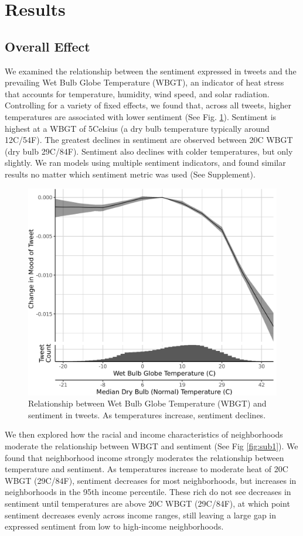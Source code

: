 \documentclass{article}
\begin{document}
\section{Results}

\subsection{Overall Effect}
We examined the relationship between the sentiment expressed in tweets and the prevailing Wet Bulb Globe Temperature (WBGT), an indicator of heat stress that accounts for temperature, humidity, wind speed, and solar radiation.  Controlling for a variety of fixed effects, we found that, across all tweets, higher temperatures are associated with lower sentiment (See Fig. \ref{fig:wbgt}).  Sentiment is highest at a WBGT of 5\textdegree Celsius (a dry bulb temperature typically around 12\textdegree C/54\textdegree F).  The greatest declines in sentiment are observed between 20\textdegree C WBGT (dry bulb 29\textdegree C/84\textdegree F).  Sentiment also declines with colder temperatures, but only slightly.  We ran models using multiple sentiment indicators, and found similar results no matter which sentiment metric was used (See Supplement).

\begin{figure}[H]
  \centering
  \includegraphics[width=0.5\linewidth]{../res/wbgt.png}
  \caption{Relationship between Wet Bulb Globe Temperature (WBGT) and sentiment in tweets.  As temperatures increase, sentiment declines.}
  \label{fig:wbgt}
\end{figure}

We then explored how the racial and income characteristics of neighborhoods moderate the relationship between WBGT and sentiment (See Fig \ref{fig:sub1}).  We found that neighborhood income strongly moderates the relationship between temperature and sentiment.  As temperatures increase to moderate heat of 20\textdegree C WBGT (29\textdegree C/84\textdegree F), sentiment decreases for most neighborhoods, but increases in neighborhoods in the 95th income percentile.  These rich do not see decreases in sentiment until temperatures are above 20\textdegree C WBGT (29\textdegree C/84\textdegree F), at which point sentiment decreases evenly across income ranges, still leaving a large gap in expressed sentiment from low to high-income neighborhoods.
\end{document}
